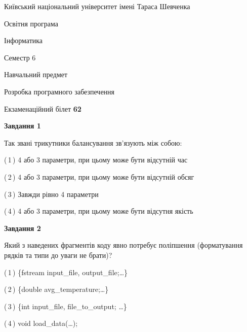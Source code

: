 \documentclass[10pt, ukrainian]{article}
\begin{document}
{{\begin {small}\par
{ \center  Київський національний університет імені Тараса Шевченка \par}
{\parbox {5 cm}{Освітня програма \hfill}{\parbox {7 cm}{Інформатика \hfill}}\parbox {6 cm}{\hfill Семестр 6}}\par
{\parbox {5 cm} {Навчальний предмет \hfill}\parbox {7 cm}{Розробка програмного забезпечення \hfill}\parbox {6cm}{\hfill}\par}\vspace{-7pt} \end{small}}{\center Екзаменаційний білет \No \textbf
{ 62 }\par}}
{
\begin {large}
{\begin {center}\textbf{Завдання 1}\end {center}}\par
Так звані трикутники балансування зв'язують між собою:\par
\vspace{2mm}



(\,1\,) 4 або 3 параметри, при цьому може бути відсутній час%



(\,2\,) 4 або 3 параметри, при цьому може бути відсутній обсяг %



(\,3\,) Завжди рівно 4 параметри%



(\,4\,) 4 або 3 параметри, при цьому може бути відсутня якість%


{\begin {center}\textbf{Завдання 2}\end {center}}\par
Який з наведених фрагментів коду явно потребує поліпшення (форматування рядків та типи до уваги не брати)?\par
\vspace{2mm}



(\,1\,) \{fstream input\_file, output\_file;…\} %



(\,2\,) \{double avg\_temperature;…\} %



(\,3\,) \{int input\_file, file\_to\_output; …\}%



(\,4\,) void load\_data(…);%



\end{large}}
\end{document}
